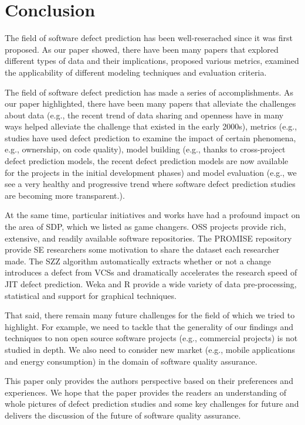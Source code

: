 \section{Conclusion} \label{conclusion}

The field of software defect prediction has been well-reserached since it was first proposed. As our paper showed, there have been many papers that explored different types of data and their implications, proposed various metrics, examined the applicability of different modeling techniques and evaluation criteria.

The field of software defect prediction has made a series of accomplishments. As our paper highlighted, there have been many papers that alleviate the challenges about data (e.g., the recent trend of data sharing and openness have in many ways helped alleviate the challenge that existed in the early 2000s), metrics (e.g., studies have used defect prediction to examine the impact of certain phenomena, e.g., ownership, on code quality), model building (e.g., thanks to cross-project defect prediction models, the recent defect prediction models are now available for the projects in the initial development phases) and model evaluation (e.g., we see a very healthy and progressive trend where software defect prediction studies are becoming more transparent.).

At the same time, particular initiatives and works have had a profound impact on the area of SDP, which we listed as game changers. OSS projects provide rich, extensive, and readily available software repositories. The PROMISE repository provide SE researchers some motivation to share the dataset each researcher made. The SZZ algorithm automatically extracts whether or not a change introduces a defect from VCSs and dramatically accelerates the research speed of JIT defect prediction. Weka and R provide a wide variety of data pre-processing, statistical and support for graphical techniques.

That said, there remain many future challenges for the field of which we tried to highlight. 
For example, we need to tackle that the generality of our findings and techniques to non open source software projects (e.g., commercial projects) is not studied in depth. We also need to consider new market (e.g., mobile applications and energy consumption) in the domain of software quality assurance.

This paper only provides the authors perspective based on their preferences and experiences.
We hope that the paper provides the readers an understanding of whole pictures of defect prediction studies and some key challenges for future and delivers the discussion of the future of software quality assurance. 
